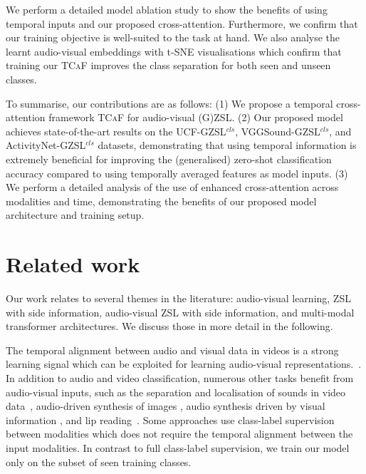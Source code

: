 \documentclass[runningheads]{llncs}
\newcommand{\mypara}[1]{\noindent{\bf{#1}}}
\newcommand{\modelName}{\textsc{TCaF}\xspace}
\newcommand{\activity}{{ActivityNet-GZSL$^{cls}$}\xspace}
\newcommand{\ucf}{{UCF-GZSL$^{cls}$}\xspace}
\newcommand{\vgg}{{VGGSound-GZSL$^{cls}$}\xspace}
\begin{document}
We perform a detailed model ablation study to show the benefits of using temporal inputs and our proposed cross-attention. Furthermore, we confirm that our training objective is well-suited to the task at hand. We also analyse the learnt audio-visual embeddings with t-SNE visualisations which confirm that training our \modelName improves the class separation for both seen and unseen classes.



To summarise, our contributions are as follows: (1) We propose a temporal cross-attention framework \modelName for audio-visual (G)ZSL. (2) Our proposed model achieves state-of-the-art results on the \ucf, \vgg, and \activity datasets, demonstrating that using temporal information is extremely beneficial for improving the (generalised) zero-shot classification accuracy compared to using temporally averaged features as model inputs. (3) We perform a detailed analysis of the use of enhanced cross-attention across modalities and time, demonstrating the benefits of our proposed model architecture and training setup. 

\section{Related work}
Our work relates to several themes in the literature: audio-visual learning, ZSL with side information, audio-visual ZSL with side information, and multi-modal transformer architectures. We discuss those in more detail in the following.

\mypara{Audio-visual learning.}
The temporal alignment between audio and visual data in videos is a strong learning signal which can be exploited for learning audio-visual representations.~\cite{owens2016ambient,owens2018learning,alwassel2019self,patrick2020multi,korbar2018cooperative,aytar2016soundnet}. In addition to audio and video classification, numerous other tasks benefit from audio-visual inputs, such as the separation and localisation of sounds in video data~\cite{owens2018audio,tian2018audio,arandjelovic2018objects,gao2019co,chen2021localizing,Afouras20b,afouras2021selfsupervised}, audio-driven synthesis of images \cite{wiles2018x2face,jamaludin2019you}, audio synthesis driven by visual information \cite{zhou2019vision,goldstein2018guitar,koepke2019visual,koepke2020sight,su2020multi,gan2020foley,narasimhan2021strumming}, and lip reading~\cite{afouras2020asr,afouras2018deep}. Some approaches use class-label supervision between modalities \cite{fayek2020large,chen2021distilling} which does not require the temporal alignment between the input modalities. In contrast to full class-label supervision, we train our model only on the subset of seen training classes. 
\end{document}
